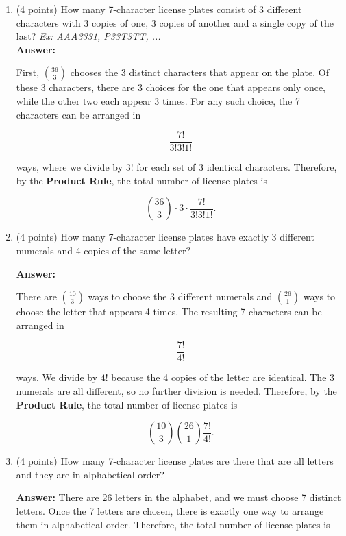 \documentclass[10pt,letterpaper,unboxed,cm]{article}
\begin{document}
\begin{enumerate}
\begin{enumerate}
Once its position is chosen, the remaining 2 positions can each contain
any of the 36 possible characters. By the \textbf{Product Rule}, there
are
\[
36^2
\]
ways to fill these positions. Since there are 3 possible placements of
\texttt{MILES}, the total number of license plates is
\[
\boxed{3(36^2)}.
\]

\item
(4 points)
How many 7-character license plates consist of 3 different characters with 3 copies of one, 3 copies of another and a single copy of the last?
\emph{Ex: AAA3331, P33T3TT, ...}\\
\textbf{Answer:}


First, $\binom{36}{3}$ chooses the 3 distinct characters that appear
on the plate. Of these 3 characters, there are 3 choices for the one
that appears only once, while the other two each appear 3 times.
For any such choice, the 7 characters can be arranged in

\[
\frac{7!}{3!3!1!}
\]

ways, where we divide by $3!$ for each set of 3 identical characters.
Therefore, by the \textbf{Product Rule}, the total number of license
plates is

\[
\boxed{\binom{36}{3}\cdot 3\cdot\frac{7!}{3!3!1!}}.
\]
\item
(4 points)
How many 7-character license plates have exactly 3 different numerals and 4 copies of the same letter?

\textbf{Answer:}


There are $\binom{10}{3}$ ways to choose the 3 different numerals and
$\binom{26}{1}$ ways to choose the letter that appears 4 times.
The resulting 7 characters can be arranged in

\[
\frac{7!}{4!}
\]

ways. We divide by $4!$ because the 4 copies of the letter are
identical. The 3 numerals are all different, so no further division
is needed.
Therefore, by the \textbf{Product Rule}, the total number of license
plates is

\[
\boxed{\binom{10}{3}\binom{26}{1}\frac{7!}{4!}}.
\]
\item
(4 points)
How many 7-character license plates are there that are all letters and they are in alphabetical order?

\textbf{Answer:} There are 26 letters in the alphabet, and we must choose 7 distinct letters.
Once the 7 letters are chosen, there is exactly one way to arrange them in
alphabetical order. Therefore, the total number of license plates is


\end{enumerate}
\end{enumerate}
\end{document}
